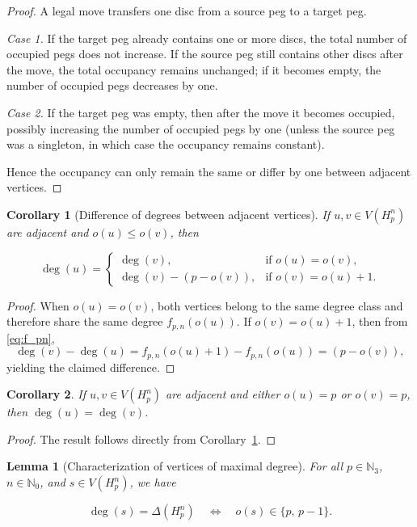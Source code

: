 \documentclass[letterpaper,12pt]{article}
\newtheorem{lemma}{Lemma}
\newtheorem{corollary}{Corollary}
\begin{document}
\begin{proof}
A legal move transfers one disc from a source peg to a target peg.

\emph{Case 1.}  
If the target peg already contains one or more discs, the total number of occupied pegs does not increase.  
If the source peg still contains other discs after the move, the total occupancy remains unchanged; if it becomes empty, the number of occupied pegs decreases by one.  

\emph{Case 2.}  
If the target peg was empty, then after the move it becomes occupied, possibly increasing the number of occupied pegs by one (unless the source peg was a singleton, in which case the occupancy remains constant).

Hence the occupancy can only remain the same or differ by one between adjacent vertices.\qedhere
\end{proof}

\begin{corollary}[Difference of degrees between adjacent vertices]\label{cor:deg-step}
If \(u,v\in V(H_p^n)\) are adjacent and \(o(u)\le o(v)\), then

\begin{equation}
    \deg(u)=
\begin{cases}
\deg(v), & \text{if } o(u)=o(v),\\[4pt]
\deg(v)-(p-o(v)), & \text{if } o(v)=o(u)+1.
\end{cases}
\end{equation}

\end{corollary}

\begin{proof}
When \(o(u)=o(v)\), both vertices belong to the same degree class and therefore share the same degree \(f_{p,n}(o(u))\).  
If \(o(v)=o(u)+1\), then from \eqref{eq:f_pn},
\[
\deg(v)-\deg(u)=f_{p,n}(o(u)+1)-f_{p,n}(o(u))
=(p-o(v)),
\]
yielding the claimed difference.\qedhere
\end{proof}

\begin{corollary}
If \(u, v \in V(H_p^n)\) are adjacent and either \(o(u) = p\) or \(o(v) = p\), then \(\deg(u) = \deg(v)\).
\end{corollary}

\begin{proof}
The result follows directly from Corollary~\ref{cor:deg-step}.
\end{proof}

\begin{lemma}[Characterization of vertices of maximal degree]\label{lemma:Deltarepeated}
For all $p \in \mathbb{N}_3$, $n \in \mathbb{N}_0$, and $s \in V(H_p^n)$, we have

\begin{equation}
    \deg(s) = \Delta(H_p^n)
\quad \Longleftrightarrow \quad
o(s) \in \{p,\, p-1\}.
\end{equation}

\end{lemma}
\end{document}
